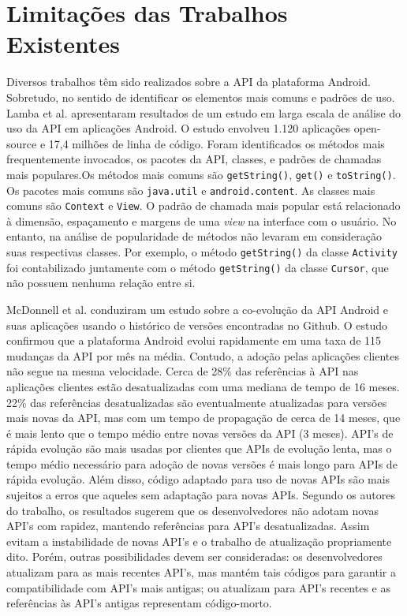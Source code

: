 \section{Limitações das Trabalhos Existentes} \label{sec:limitacao-abordagens-atuais}
Diversos trabalhos têm sido realizados sobre a API da plataforma Android. Sobretudo,
no sentido
de identificar os elementos mais comuns e padrões de uso. Lamba et al.\cite{Lamba2015} apresentaram
resultados de um estudo em larga escala de análise do uso da API em aplicações Android.
O estudo envolveu 1.120 aplicações open-source e 17,4 milhões de linha de código.
Foram identificados os métodos mais frequentemente invocados, os pacotes da API,
classes, e padrões de chamadas mais populares.Os métodos mais comuns são \texttt{getString()},
\texttt{get()} e \texttt{toString()}. Os pacotes mais comuns são \texttt{java.util} e
\texttt{android.content}. As classes mais comuns são \texttt{Context} e \texttt{View}.
O padrão de chamada mais popular está relacionado à dimensão, espaçamento e margens
de uma \textit{view} na interface com o usuário. No entanto, na análise de popularidade
de métodos não levaram em consideração suas respectivas classes. Por exemplo, o método
\texttt{getString()} da classe \texttt{Activity} foi contabilizado juntamente com
o método \texttt{getString()} da classe \texttt{Cursor}, que não possuem nenhuma
relação entre si.

McDonnell et al. \cite{McDonnell2013} conduziram um estudo sobre a co-evolução
da API Android e suas aplicações usando o histórico de versões encontradas no
Github. O estudo confirmou que a plataforma Android evolui rapidamente em uma
taxa de 115 mudanças da API por mês na média. Contudo, a adoção pelas aplicações
clientes não segue na mesma velocidade. Cerca de 28\% das referências à API nas
aplicações clientes estão desatualizadas com uma mediana de tempo de 16 meses.
22\% das referências desatualizadas são eventualmente atualizadas para versões
mais novas da API, mas com um tempo de propagação de cerca de 14 meses, que é mais
lento que o tempo médio entre novas versões da API (3 meses). API's de rápida
evolução são mais usadas por clientes que APIs de evolução lenta, mas o tempo
médio necessário para adoção de novas versões é mais longo para APIs de rápida
evolução. Além disso, código adaptado para uso de novas APIs são mais sujeitos a
erros que aqueles sem adaptação para novas APIs. Segundo os autores do trabalho,
os resultados sugerem que os desenvolvedores não adotam novas API's com rapidez,
mantendo referências para API's desatualizadas. Assim evitam a instabilidade de
novas API's e o trabalho de atualização propriamente dito. Porém, outras possibilidades
devem ser consideradas: os desenvolvedores atualizam para as mais recentes API's,
mas mantém tais códigos para garantir a compatibilidade com API's mais antigas;
ou atualizam para API's recentes e as referências às API's antigas representam
código-morto.

